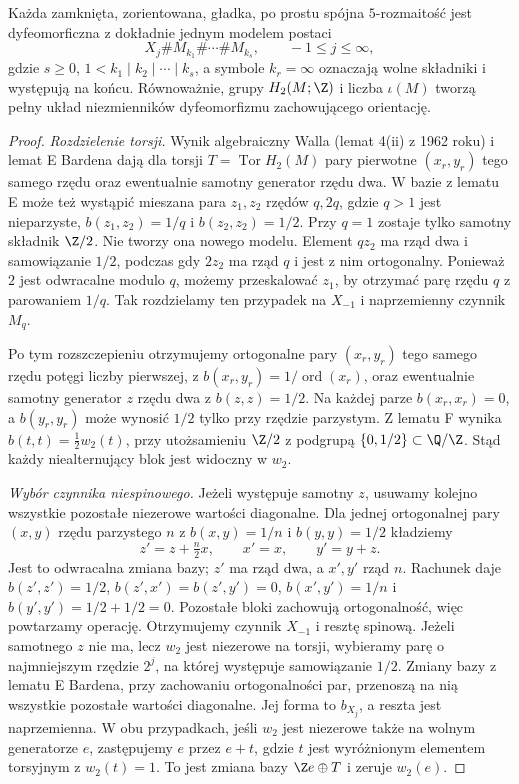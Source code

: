 \begin{twierdzenie}
\label{thm:barden-kanoniczna-24}
Każda zamknięta, zorientowana,
gładka, po prostu spójna
$5$-rozmaitość jest dyfeomorficzna
z dokładnie jednym modelem postaci
\[
 X_j\# M_{k_1}\#\cdots\#M_{k_s},
 \qquad -1\leq j\leq\infty,
\]
gdzie $s\geq0$,
$1<k_1\mid k_2\mid\cdots\mid k_s$,
a symbole $k_r=\infty$ oznaczają
wolne składniki i występują na końcu.
Równoważnie, grupy $H_2(M;\Z)$
i liczba $\iota(M)$ tworzą pełny
układ niezmienników dyfeomorfizmu
zachowującego orientację.
\end{twierdzenie}
\begin{proof}
\emph{Rozdzielenie torsji.}
Wynik algebraiczny Walla
(lemat 4(ii) z 1962 roku) i lemat E
Bardena dają dla torsji $T=\operatorname{Tor}H_2(M)$
pary pierwotne $(x_r,y_r)$ tego samego
rzędu oraz ewentualnie samotny
generator rzędu dwa. W bazie
z lematu E może też wystąpić
mieszana para $z_1,z_2$
rzędów $q,2q$, gdzie $q>1$ jest
nieparzyste, $b(z_1,z_2)=1/q$
i $b(z_2,z_2)=1/2$.
Przy $q=1$ zostaje tylko samotny
składnik $\Z/2$.
Nie tworzy ona nowego modelu.
Element $qz_2$ ma rząd dwa i
samowiązanie $1/2$, podczas gdy
$2z_2$ ma rząd $q$ i jest
z nim ortogonalny. Ponieważ
$2$ jest odwracalne modulo $q$,
możemy przeskalować $z_1$, by
otrzymać parę rzędu $q$
z parowaniem $1/q$.
Tak rozdzielamy ten przypadek na
$X_{-1}$ i naprzemienny czynnik
$M_q$.

Po tym rozszczepieniu otrzymujemy
ortogonalne pary $(x_r,y_r)$
tego samego rzędu potęgi liczby
pierwszej, z
$b(x_r,y_r)=1/\operatorname{ord}(x_r)$,
oraz ewentualnie samotny generator
$z$ rzędu dwa z $b(z,z)=1/2$.
Na każdej parze $b(x_r,x_r)=0$,
a $b(y_r,y_r)$ może wynosić $1/2$
tylko przy rzędzie parzystym.
Z lematu F wynika
$b(t,t)=\tfrac12w_2(t)$, przy
utożsamieniu $\Z/2$ z podgrupą
$\{0,1/2\}\subset\Q/\Z$.
Stąd każdy niealternujący blok
jest widoczny w $w_2$.

\emph{Wybór czynnika niespinowego.}
Jeżeli występuje samotny $z$,
usuwamy kolejno wszystkie pozostałe
niezerowe wartości diagonalne.
Dla jednej ortogonalnej pary
$(x,y)$ rzędu parzystego $n$ z
$b(x,y)=1/n$ i $b(y,y)=1/2$
kładziemy
\[
 z'=z+\tfrac n2x,\qquad
 x'=x,\qquad y'=y+z.
\]
Jest to odwracalna zmiana bazy;
$z'$ ma rząd dwa, a $x',y'$ rząd $n$.
Rachunek daje
$b(z',z')=1/2$,
$b(z',x')=b(z',y')=0$,
$b(x',y')=1/n$ i
$b(y',y')=1/2+1/2=0$.
Pozostałe bloki zachowują
ortogonalność, więc powtarzamy
operację. Otrzymujemy czynnik
$X_{-1}$ i resztę spinową.
Jeżeli samotnego $z$ nie ma, lecz
$w_2$ jest niezerowe na torsji,
wybieramy parę o najmniejszym rzędzie
$2^j$, na której występuje
samowiązanie $1/2$. Zmiany bazy
z lematu E Bardena, przy zachowaniu
ortogonalności par, przenoszą na nią
wszystkie pozostałe wartości diagonalne.
Jej forma to $b_{X_j}$, a reszta
jest naprzemienna. W obu przypadkach,
jeśli $w_2$ jest niezerowe także na
wolnym generatorze $e$, zastępujemy
$e$ przez $e+t$, gdzie $t$ jest
wyróżnionym elementem torsyjnym
z $w_2(t)=1$. To jest zmiana bazy
$\Z e\oplus T$ i zeruje $w_2(e)$.


\end{proof}
